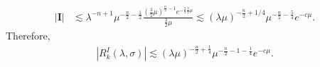 \documentclass[11pt, reqno]{amsart}
\theoremstyle{plain}
\theoremstyle{remark}
\theoremstyle{example}
\theoremstyle{definition}
\numberwithin{equation}{section}
\begin{document}
\begin{equation*}
  \begin{split}
      |\textbf{I}| & \lesssim \lambda^{-n+1} \mu^{-\frac{n}{2} - \frac{1}{2}} \frac{  \left( \frac{3}{2} \mu \right)^{\frac{n}{2}-1} e^{-\frac{2}{3} \frac{3}{2} \mu }         }{{\textstyle\frac{3}{2}} \mu} \lesssim  (\lambda \mu)^{ -\frac{n}{2} + 1/4} \mu^{-\frac{n}{2}-\frac{5}{4}} e^{-c \mu} .
  \end{split}
\end{equation*}
Therefore, 
\begin{equation*}
  \begin{split}
      |R_{k}^{I}(\lambda, \sigma)| \lesssim  (\lambda \mu)^{-\frac{n}{2} + \frac{1}{4}}  \mu^{-\frac{n}{2} -1-  \frac{1}{4}} e^{-c \mu}.
  \end{split}
\end{equation*}
\end{document}
